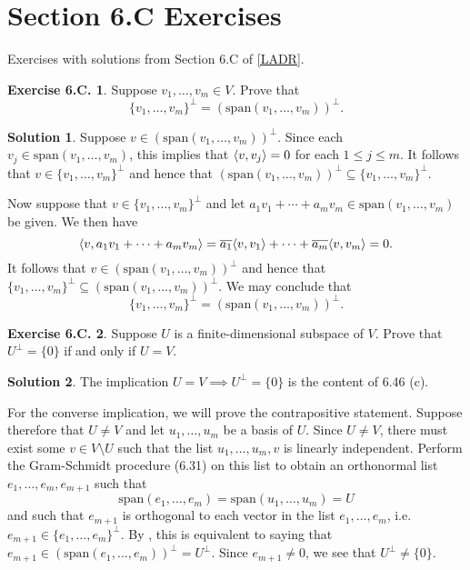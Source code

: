 \documentclass[12pt]{article}
\theoremstyle{definition}
\theoremstyle{exercise}
\newtheorem{exercise}{Exercise 6.C.}
\theoremstyle{solution}
\newtheorem*{solution}{Solution}
\newcommand{\Span}{\text{span}}
\newcommand{\ocomp}[1]{#1^{\perp}}
\DeclarePairedDelimiter\ip{\langle}{\rangle}
\begin{document}
\section{Section 6.C Exercises}

Exercises with solutions from Section 6.C of \hyperlink{ladr}{[LADR]}.

\begin{exercise}
\label{ex:1}
    Suppose \( v_1, \ldots, v_m \in V \). Prove that
    \[
        \ocomp{\{ v_1, \ldots, v_m \}} = \ocomp{(\Span(v_1, \ldots, v_m))}.
    \]
\end{exercise}

\begin{solution}
    Suppose \( v \in \ocomp{(\Span(v_1, \ldots, v_m))} \). Since each \( v_j \in \Span(v_1, \ldots, v_m) \), this implies that \( \ip{v, v_j} = 0 \) for each \( 1 \leq j \leq m \). It follows that \( v \in \ocomp{\{ v_1, \ldots, v_m \}} \) and hence that \( \ocomp{(\Span(v_1, \ldots, v_m))} \subseteq \ocomp{\{ v_1, \ldots, v_m \}} \).

    Now suppose that \( v \in \ocomp{\{ v_1, \ldots, v_m \}} \) and let \( a_1 v_1 + \cdots + a_m v_m \in \Span(v_1, \ldots, v_m) \) be given. We then have
    \[
        \ip{v, a_1 v_1 + \cdots + a_m v_m} = \overline{a_1} \ip{v, v_1} + \cdots + \overline{a_m} \ip{v, v_m} = 0.
    \]
    It follows that \( v \in \ocomp{(\Span(v_1, \ldots, v_m))} \) and hence that \( \ocomp{\{ v_1, \ldots, v_m \}} \subseteq \ocomp{(\Span(v_1, \ldots, v_m))} \). We may conclude that
    \[
        \ocomp{\{ v_1, \ldots, v_m \}} = \ocomp{(\Span(v_1, \ldots, v_m))}.
    \]
\end{solution}

\begin{exercise}
\label{ex:2}
    Suppose \( U \) is a finite-dimensional subspace of \( V \). Prove that \( \ocomp{U} = \{ 0 \} \) if and only if \( U = V \).

\end{exercise}

\begin{solution}
    The implication \( U = V \implies \ocomp{U} = \{ 0 \} \) is the content of 6.46 (c).
    
    For the converse implication, we will prove the contrapositive statement. Suppose therefore that \( U \neq V \) and let \( u_1, \ldots, u_m \) be a basis of \( U \). Since \( U \neq V \), there must exist some \( v \in V \setminus U \) such that the list \( u_1, \ldots, u_m, v \) is linearly independent. Perform the Gram-Schmidt procedure (6.31) on this list to obtain an orthonormal list \( e_1, \ldots, e_m, e_{m+1} \) such that
    \[
        \Span(e_1, \ldots, e_m) = \Span(u_1, \ldots, u_m) = U
    \]
    and such that \( e_{m+1} \) is orthogonal to each vector in the list \( e_1, \ldots, e_m \), i.e.\ \( e_{m+1} \in \ocomp{\{ e_1, \ldots, e_m \}} \). By , this is equivalent to saying that \( e_{m+1} \in \ocomp{(\Span(e_1, \ldots, e_m))} = \ocomp{U} \). Since \( e_{m+1} \neq 0 \), we see that \( \ocomp{U} \neq \{ 0 \} \).
\end{solution}
\end{document}
